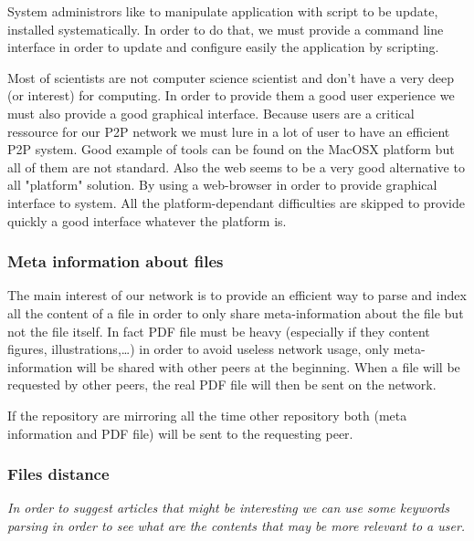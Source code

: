 System administrors like to manipulate application with script to be update, installed
systematically. In order to do that, we must provide a command line interface in order
to update and configure easily the application by scripting.

Most of scientists are not computer science scientist and don't have a very deep (or interest)
for computing. In order to provide them a good user experience we must also provide a good 
graphical interface. Because users are a critical ressource for our P2P network we 
must lure in a lot of user to have an efficient P2P system. Good example
of tools can be found on the MacOSX platform but all of them
are not standard. Also the web seems to be a very good alternative
to all "platform" solution. By using a web-browser in order
to provide graphical interface to system. All the platform-dependant
difficulties are skipped to provide quickly a good interface whatever
the platform is.

\subsubsection{Meta information about files}

The main interest of our network is to provide an efficient way to parse and
index all the content of a file in order to only share meta-information about the
file but not the file itself. In fact PDF file must be heavy (especially if
they content figures, illustrations,\ldots) in order to avoid useless network usage,
only meta-information will be shared with other peers at the beginning. When a file
will be requested by other peers, the real PDF file will then be sent on the network.

If the repository are mirroring all the time other repository both (meta information and
PDF file) will be sent to the requesting peer.

\subsubsection{Files distance}

\textit{In order to suggest articles that might be interesting we can use
some keywords parsing in order to see what are the contents that may be more
relevant to a user.}

